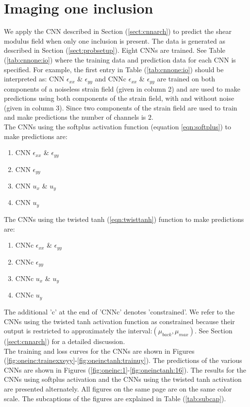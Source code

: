 \documentclass[12pt]{article}
\begin{document}
\section{\label{sect:oneinc}Imaging one inclusion}
We apply the CNN described in Section (\ref{sect:cnnarch}) to predict the shear modulus field when only one inclusion is present. The data is generated as described in Section (\ref{sect:probsetup}). Eight CNNs are trained. See Table (\ref{tab:cnnone:io}) where the training data and prediction data for each CNN is specified. For example, the first entry in Table (\ref{tab:cnnone:io}) should be interpreted as: CNN $\epsilon_{xx}$ \& $\epsilon_{yy}$ and CNNc $\epsilon_{xx}$ \& $\epsilon_{yy}$ are trained on both components of a noiseless strain field (given in column 2) and are used to make predictions using both components of the strain field, with and without noise (given in column 3). Since two components of the strain field are used to train and make predictions the number of channels is $2$.\\The CNNs using the softplus activation function (equation \ref{eqn:softplus}) to make predictions are:
\begin{enumerate}
\item{CNN $\epsilon_{xx}$ \& $\epsilon_{yy}$}
\item{CNN $\epsilon_{yy}$}
\item{CNN $u_x$ \& $u_y$}
\item{CNN $u_y$}
\end{enumerate}
The CNNs using the twisted tanh (\ref{eqn:twisttanh}) function to make predictions are:
\begin{enumerate}
\item{CNNc $\epsilon_{xx}$ \& $\epsilon_{yy}$}
\item{CNNc $\epsilon_{yy}$}
\item{CNNc $u_x$ \& $u_y$}
\item{CNNc $u_y$}
\end{enumerate}
The additional 'c' at the end of 'CNNc' denotes 'constrained'. We refer to the CNNs using the twisted tanh activation function as constrained because their output is restricted to approximately the interval:$(\mu_{back},\mu_{max})$. See Section (\ref{sect:cnnarch}) for a detailed discussion. \\
The training and loss curves for the CNNs are shown in Figures (\ref{fig:oneinc:trainexxeyy}-\ref{fig:oneinctanh:trainuy}). The predictions of the various CNNs are shown in Figures (\ref{fig:oneinc:1}-\ref{fig:oneinctanh:16}). The results for the CNNs using softplus activation and the CNNs using the twisted tanh activation are presented alternately. All figures on the same page are on the same color scale. The subcaptions of the figures are explained in Table (\ref{tab:subcap}).\\
\end{document}
